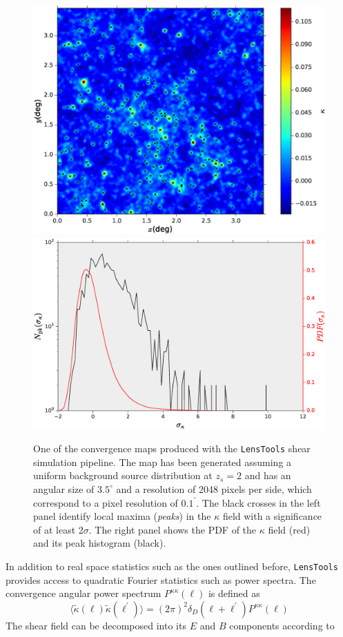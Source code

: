 \documentclass[reprint,aps,prd,superscriptaddress,showkeys,showpacs]{revtex4-1}
\newcommand{\LT}{\texttt{LensTools} }
\begin{document}
\begin{figure}
\includegraphics[scale=0.3]{Figures/convergence_visualize.eps}
\includegraphics[scale=0.3]{Figures/convergence_stats.eps}
\caption{One of the convergence maps produced with the \LT shear simulation pipeline. The map has been generated assuming a uniform background source distribution at $z_s=2$ and has an angular size of $3.5^\circ$ and a resolution of 2048 pixels per side, which correspond to a pixel resolution of $0.1^\prime$. The black crosses in the left panel identify local maxima (\textit{peaks}) in the $\kappa$ field with a significance of at least 2$\sigma$. The right panel shows the PDF of the $\kappa$ field (red) and its peak histogram (black).}
\label{convergencefig}
\end{figure}
%
In addition to real space statistics such as the ones outlined before, \LT provides access to quadratic Fourier statistics such as power spectra. The convergence angular power spectrum $P^{\kappa\kappa}(\ell)$ is defined as  
\begin{equation}
\label{kappapsdefinition}
\langle\tilde{\kappa}(\pmb{\ell})\tilde{\kappa}(\pmb{\ell}^\prime)\rangle = (2\pi)^2\delta_D(\pmb{\ell}+\pmb{\ell}^\prime)P^{\kappa\kappa}(\ell)
\end{equation}
%
The shear field can be decomposed into its $E$ and $B$ components according to 
\end{document}
